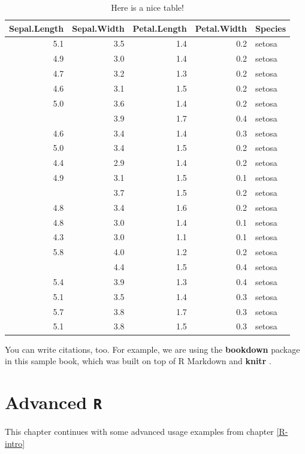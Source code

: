 \documentclass[]{book}
\theoremstyle{definition}
\theoremstyle{definition}
\theoremstyle{definition}
\theoremstyle{remark}
\begin{document}
\begin{table}

\caption{\label{tab:nice-tab}Here is a nice table!}
\centering
\begin{tabular}[t]{rrrrl}
\toprule
Sepal.Length & Sepal.Width & Petal.Length & Petal.Width & Species\\
\midrule
5.1 & 3.5 & 1.4 & 0.2 & setosa\\
4.9 & 3.0 & 1.4 & 0.2 & setosa\\
4.7 & 3.2 & 1.3 & 0.2 & setosa\\
4.6 & 3.1 & 1.5 & 0.2 & setosa\\
5.0 & 3.6 & 1.4 & 0.2 & setosa\\
\addlinespace
5.4 & 3.9 & 1.7 & 0.4 & setosa\\
4.6 & 3.4 & 1.4 & 0.3 & setosa\\
5.0 & 3.4 & 1.5 & 0.2 & setosa\\
4.4 & 2.9 & 1.4 & 0.2 & setosa\\
4.9 & 3.1 & 1.5 & 0.1 & setosa\\
\addlinespace
5.4 & 3.7 & 1.5 & 0.2 & setosa\\
4.8 & 3.4 & 1.6 & 0.2 & setosa\\
4.8 & 3.0 & 1.4 & 0.1 & setosa\\
4.3 & 3.0 & 1.1 & 0.1 & setosa\\
5.8 & 4.0 & 1.2 & 0.2 & setosa\\
\addlinespace
5.7 & 4.4 & 1.5 & 0.4 & setosa\\
5.4 & 3.9 & 1.3 & 0.4 & setosa\\
5.1 & 3.5 & 1.4 & 0.3 & setosa\\
5.7 & 3.8 & 1.7 & 0.3 & setosa\\
5.1 & 3.8 & 1.5 & 0.3 & setosa\\
\bottomrule
\end{tabular}
\end{table}

You can write citations, too. For example, we are using the
\textbf{bookdown} package \citep{R-bookdown} in this sample book, which
was built on top of R Markdown and \textbf{knitr} \citep{xie2015}.

\chapter{\texorpdfstring{Advanced
\texttt{R}}{Advanced R}}\label{R-advanced}

This chapter continues with some advanced usage examples from chapter
\ref{R-intro}
\end{document}
